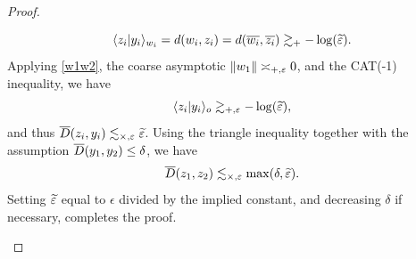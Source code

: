 \begin{proof}
\begin{itemize}
\[
\langle z_i|y_i\rangle_{w_i} = d(w_i,z_i) = d(\overline{w_i},\overline{z_i}) \gtrsim_+ -\log(\widetilde{\varepsilon}).
\]
Applying \eqref{w1w2}, the coarse asymptotic $\|w_1\| \asymp_{+,\varepsilon} 0$, and the CAT(-1) inequality, we have
\[
\langle z_i|y_i\rangle_o \gtrsim_{+,\varepsilon} -\log(\widetilde{\varepsilon}),
\]
and thus $\overline{D}(z_i,y_i)\lesssim_{\times,\varepsilon} \widetilde{\varepsilon}$. Using the triangle inequality together with the assumption $\overline{D}(y_1,y_2)\leq\delta$, we have
\[
\overline{D}(z_1,z_2) \lesssim_{\times,\varepsilon} \max(\delta,\widetilde{\varepsilon}).
\]
Setting $\widetilde{\varepsilon}$ equal to $\epsilon$ divided by the implied constant, and decreasing $\delta$ if necessary, completes the proof.
\end{itemize}

%
%
%
%
\end{proof}

